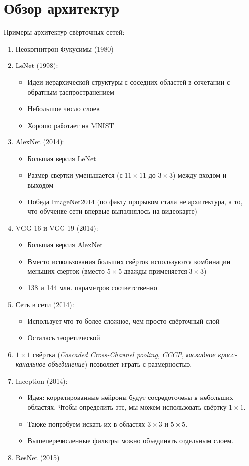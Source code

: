 \section{Обзор архитектур}

Примеры архитектур свёрточных сетей:
\begin{enumerate}
    \item Неокогнитрон Фукусимы (1980)
    \item LeNet (1998):
    \begin{itemize}
        \item Идеи иерархической структуры с соседних областей в сочетании с обратным распространением
        \item Небольшое число слоев
        \item Хорошо работает на MNIST
    \end{itemize}
    \item AlexNet (2014):
    \begin{itemize}
        \item Большая версия LeNet
        \item Размер свертки уменьшается (с $11\times11$ до $3\times3$) между входом и выходом
        \item Победа ImageNet2014 (по факту прорывом стала не архитектура, а то, что обучение сети впервые выполнялось на видеокарте)
    \end{itemize}
    \item VGG-16 и VGG-19 (2014):
    \begin{itemize}
        \item Большая версия AlexNet
        \item Вместо использования больших свёрток используются комбинации меньших сверток (вместо $5\times5$ дважды применяется $3\times3$)
        \item 138 и 144 млн. параметров соответственно
    \end{itemize}
    \item Сеть в сети (2014):
    \begin{itemize}
        \item Использует что-то более сложное, чем просто свёрточный слой
        \item Осталась теоретической
    \end{itemize}
    \item $1\times1$ свёртка (\textit{Cascaded Cross-Channel pooling}, \textit{CCCP}, \textit{каскадное кросс-канальное объединение}) позволяет играть с размерностью.
    \item Inception (2014):
    \begin{itemize}
        \item Идея: коррелированные нейроны будут сосредоточены в небольших областях. Чтобы определить это, мы можем использовать свёртку $1\times1$.
        \item Также попробуем искать их в областях $3\times3$ и $5\times5$.
        \item Вышеперечисленные фильтры можно объединять отдельным слоем.
    \end{itemize}
    \item ResNet (2015)
\end{enumerate}

